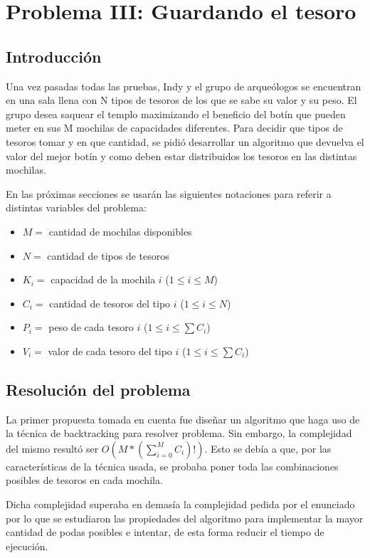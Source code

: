 \section{Problema III: Guardando el tesoro}

\subsection{Introducción}

Una vez pasadas todas las pruebas, Indy y el grupo de arqueólogos se encuentran en una sala llena con N tipos de tesoros de los que se sabe su valor y su peso. 
El grupo desea saquear el templo maximizando el beneficio del botín que pueden meter en sus M mochilas de capacidades diferentes.
Para decidir que tipos de tesoros tomar y en que cantidad, se pidió desarrollar un algoritmo que devuelva el valor del mejor botín y como deben estar distribuidos los tesoros en las distintas mochilas.

En las próximas secciones se usarán las siguientes notaciones para referir a distintas variables del problema:

\begin{itemize}
\item $M =$ cantidad de mochilas disponibles
\item $N =$ cantidad de tipos de tesoros
\item $K_i = $ capacidad de la mochila $i$ ($1 \leq i \leq M$)
\item $C_i = $ cantidad de tesoros del tipo $i$ ($1 \leq i \leq N$)
\item $P_i = $ peso de cada tesoro $i$ ($1 \leq i \leq \sum C_i$)
\item $V_i = $ valor de cada tesoro del tipo $i$ ($1 \leq i \leq \sum C_i$)
\end{itemize}

\subsection{Resolución del problema}
La primer propuesta tomada en cuenta fue diseñar un algoritmo que haga uso de la técnica de backtracking para resolver problema. Sin embargo, la complejidad del mismo resultó ser $O(M*(\sum_{i=0}^{M}{C_i})!)$. Esto se debía a que, por las características de la técnica usada, se probaba poner toda las combinaciones posibles de tesoros en cada mochila.

Dicha complejidad superaba en demasía la complejidad pedida por el enunciado por lo que se estudiaron las propiedades del algoritmo para implementar la mayor cantidad de podas posibles e intentar, de esta forma reducir el tiempo de ejecución.

